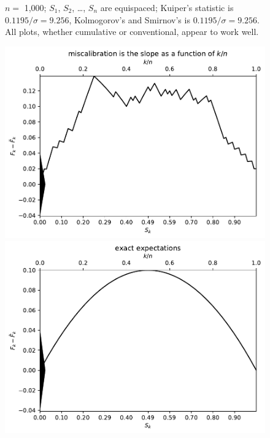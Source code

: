 \documentclass{article}
\begin{document}
\begin{figure}
\begin{centering}
\end{centering}
\caption{$n =$ 1,000; $S_1$, $S_2$, \dots, $S_n$ are equispaced;
         Kuiper's statistic is $0.1195 / \sigma = 9.256$,
         Kolmogorov's and Smirnov's is $0.1195 / \sigma = 9.256$.
All plots, whether cumulative or conventional, appear to work well.
}
\label{1000}
\end{figure}


\begin{figure}
\begin{centering}

\parbox{\imsize}{\includegraphics[width=\imsize]
                {./codes/unweighted/100_4_0_0/cumulative.pdf}}
\quad\quad
\parbox{\imsize}{\includegraphics[width=\imsize]
                {./codes/unweighted/100_4_0_0/cumulative_exact.pdf}}


\end{centering}
\end{figure}
\end{document}
